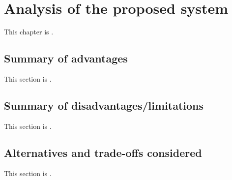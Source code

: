
\chapter{Analysis of the proposed system}
\label{loc:Analysis of the proposed system}


This chapter is \TBD.

\section{Summary of advantages}
\label{loc:Summary of advantages}


This section is \TBD.


\section{Summary of disadvantages/limitations}
\label{loc:Summary of disadvantages/limitations}


This section is \TBD.


\section{Alternatives and trade-offs considered}
\label{loc:Alternatives and trade-offs considered}


This section is \TBD.
